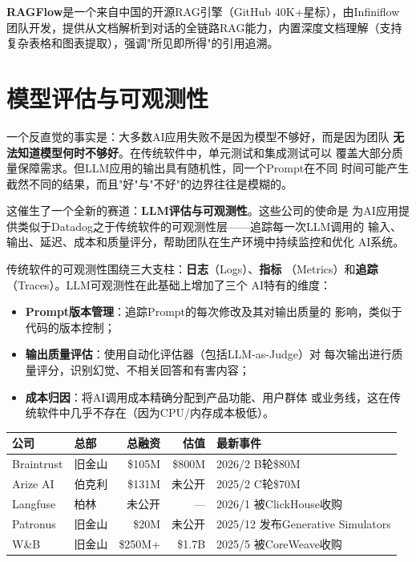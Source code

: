 \textbf{RAGFlow}是一个来自中国的开源RAG引擎（GitHub 40K+星标），由Infiniflow
团队开发，提供从文档解析到对话的全链路RAG能力，内置深度文档理解（支持
复杂表格和图表提取），强调"所见即所得"的引用追溯。


\section{模型评估与可观测性}
\label{sec:platform-eval}

一个反直觉的事实是：大多数AI应用失败不是因为模型不够好，而是因为团队
\textbf{无法知道模型何时不够好}。在传统软件中，单元测试和集成测试可以
覆盖大部分质量保障需求。但LLM应用的输出具有随机性，同一个Prompt在不同
时间可能产生截然不同的结果，而且"好"与"不好"的边界往往是模糊的。

这催生了一个全新的赛道：\textbf{LLM评估与可观测性}。这些公司的使命是
为AI应用提供类似于Datadog之于传统软件的可观测性层——追踪每一次LLM调用的
输入、输出、延迟、成本和质量评分，帮助团队在生产环境中持续监控和优化
AI系统。

传统软件的可观测性围绕三大支柱：\textbf{日志}（Logs）、\textbf{指标}
（Metrics）和\textbf{追踪}（Traces）。LLM可观测性在此基础上增加了三个
AI特有的维度：
\begin{itemize}
  \item \textbf{Prompt版本管理}：追踪Prompt的每次修改及其对输出质量的
    影响，类似于代码的版本控制；
  \item \textbf{输出质量评估}：使用自动化评估器（包括LLM-as-Judge）对
    每次输出进行质量评分，识别幻觉、不相关回答和有害内容；
  \item \textbf{成本归因}：将AI调用成本精确分配到产品功能、用户群体
    或业务线，这在传统软件中几乎不存在（因为CPU/内存成本极低）。
\end{itemize}

\begin{keybox}[LLM评估与可观测性赛道融资一览]
\small
\begin{tabularx}{\textwidth}{l l r r l}
\toprule
\rowcolor{figLightGray}
\textbf{公司} & \textbf{总部} & \textbf{总融资} & \textbf{估值} & \textbf{最新事件} \\
\midrule
Braintrust & 旧金山  & \$105M   & \$800M  & 2026/2 B轮\$80M \\
Arize AI   & 伯克利  & \$131M   & 未公开  & 2025/2 C轮\$70M \\
Langfuse   & 柏林    & 未公开   & ---     & 2026/1 被ClickHouse收购 \\
Patronus   & 旧金山  & \$20M    & 未公开  & 2025/12 发布Generative Simulators \\
W\&B       & 旧金山  & \$250M+  & \$1.7B  & 2025/5 被CoreWeave收购 \\
\bottomrule
\end{tabularx}
\end{keybox}

